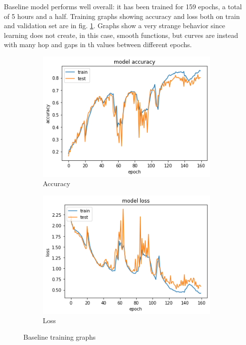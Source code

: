 \documentclass{article}
\begin{document}
Baseline model performs well overall: it has been trained for 159 epochs, a total of 5 hours and a half. Training graphs showing accuracy and loss both on train and validation set are in fig. \ref{fig:mono_base_result}. Graphs show a very strange behavior since learning does not create, in this case, smooth functions, but curves are instead with many hop and gaps in th values between different epochs. 

\begin{figure}[H]
	\centering
	\begin{subfigure}{.5\textwidth}
		\centering
		\includegraphics[width=.95\linewidth]{./images/mono/baseline_acc.png}
		\caption{Accuracy}
	\end{subfigure}%
	\begin{subfigure}{.5\textwidth}
		\centering
		\includegraphics[width=.95\linewidth]{./images/mono/baseline_loss.png}
		\caption{Loss}
	\end{subfigure}
	\caption{Baseline training graphs}
	\label{fig:mono_base_result}
\end{figure}
\end{document}
